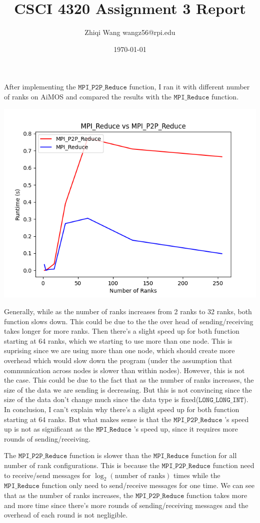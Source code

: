 \documentclass{article}
\begin{document}
\title{\vspace{-3cm}CSCI 4320 Assignment 3 Report}
\author{Zhiqi Wang wangz56@rpi.edu}
\date{\today}
\maketitle

After implementing the $\texttt{MPI\_P2P\_Reduce}$ function, I ran it with different number
of ranks on AiMOS and compared the results with the $\texttt{MPI\_Reduce}$ function.

\includegraphics[width=\textwidth]{p2p-runtime.png}

Generally, while as the number of ranks increases from 2
ranks to 32 ranks, both function slows down. This could be due to the the over head of 
sending/receiving takes longer for more ranks. Then there's a slight speed up
for both function starting at 64 ranks, which we starting to use more than one node. 
This is suprising since we are using more than one node, which should create more 
overhead which would slow down the program (under the assumption that communication
across nodes is slower than within nodes). However, this is not the case. 
This could be due to the fact that as the number of ranks increases, the size of the 
data we are sending is decreasing. But this is not convincing since the size of the data
don't change much since the data type is fixed($\texttt{LONG\_LONG\_INT}$). In conclusion, 
I can't explain why there's a slight speed up for both function starting at 64 ranks. But 
what makes sense is that the $\texttt{MPI\_P2P\_Reduce}$ 's speed up is not as significant
as the $\texttt{MPI\_Reduce}$ 's speed up, since it requires more rounds of sending/receiving.


The $\texttt{MPI\_P2P\_Reduce}$ function is slower than the $\texttt{MPI\_Reduce}$ function
for all number of rank configurations. 
This is because the $\texttt{MPI\_P2P\_Reduce}$ function
need to receive/send messages for $\log_2 (\text{number of ranks})$ times while the
$\texttt{MPI\_Reduce}$ function only need to send/receive messages for one time.
We can see that as the number of ranks increases, the $\texttt{MPI\_P2P\_Reduce}$ function
takes more and more time since there's more rounds of sending/receiving messages and the 
overhead of each round is not negligible. 
\end{document}
